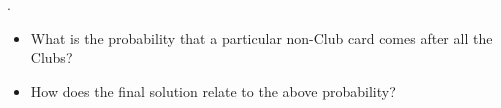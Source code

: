\begin{hint}.
\begin{itemize}
\item What is the probability that a particular non-Club card comes after all the Clubs?
\item How does the final solution relate to the above probability?
\end{itemize}

\end{hint}